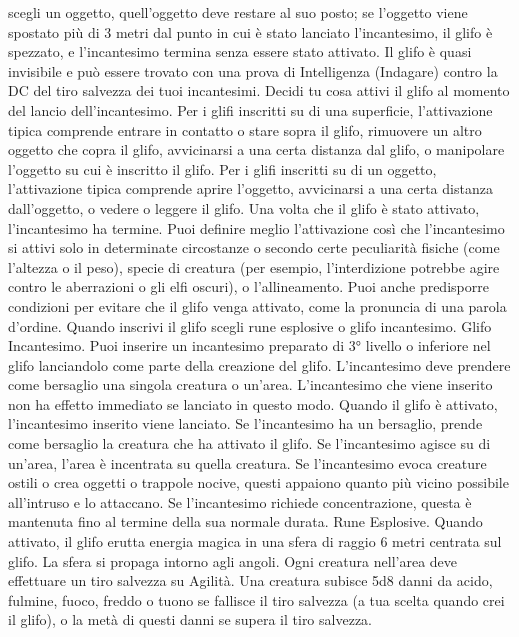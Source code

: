 \begin{multicols}{2}
scegli un oggetto, quell’oggetto deve restare al suo
posto; se l’oggetto viene spostato più di 3 metri dal
punto in cui è stato lanciato l’incantesimo, il glifo è
spezzato, e l’incantesimo termina senza essere stato
attivato.
Il glifo è quasi invisibile e può essere trovato con una
prova di Intelligenza (Indagare) contro la DC del tiro
salvezza dei tuoi incantesimi.
Decidi tu cosa attivi il glifo al momento del lancio
dell’incantesimo.
Per i glifi inscritti su di una superficie, l’attivazione tipica
comprende entrare in contatto o stare sopra il glifo,
rimuovere un altro oggetto che copra il glifo, avvicinarsi
a una certa distanza dal glifo, o manipolare l’oggetto su
cui è inscritto il glifo.
Per i glifi inscritti su di un oggetto, l’attivazione tipica
comprende aprire l’oggetto, avvicinarsi a una certa
distanza dall’oggetto, o vedere o leggere il glifo. Una
volta che il glifo è stato attivato, l’incantesimo ha
termine.
Puoi definire meglio l’attivazione così che l’incantesimo
si attivi solo in determinate circostanze o secondo certe
peculiarità fisiche (come l’altezza o il peso), specie di
creatura (per esempio, l’interdizione potrebbe agire
contro le aberrazioni o gli elfi oscuri), o l’allineamento.
Puoi anche predisporre condizioni per evitare che il glifo
venga attivato, come la pronuncia di una parola
d’ordine.
Quando inscrivi il glifo scegli rune esplosive o glifo
incantesimo.
Glifo Incantesimo. Puoi inserire un incantesimo
preparato di 3° livello o inferiore nel glifo lanciandolo
come parte della creazione del glifo. L’incantesimo
deve prendere come bersaglio una singola creatura o
un’area. L’incantesimo che viene inserito non ha effetto
immediato se lanciato in questo modo. Quando il glifo è
attivato, l’incantesimo inserito viene lanciato. Se
l’incantesimo ha un bersaglio, prende come bersaglio la
creatura che ha attivato il glifo. Se l’incantesimo agisce
su di un’area, l’area è incentrata su quella creatura. Se
l’incantesimo evoca creature ostili o crea oggetti o
trappole nocive, questi appaiono quanto più vicino
possibile all’intruso e lo attaccano. Se l’incantesimo
richiede concentrazione, questa è mantenuta fino al
termine della sua normale durata.
Rune Esplosive. Quando attivato, il glifo erutta energia
magica in una sfera di raggio 6 metri centrata sul glifo.
La sfera si propaga intorno agli angoli. Ogni creatura
nell’area deve effettuare un tiro salvezza su Agilità.
Una creatura subisce 5d8 danni da acido, fulmine,
fuoco, freddo o tuono se fallisce il tiro salvezza (a tua
scelta quando crei il glifo), o la metà di questi danni se
supera il tiro salvezza.

\end{multicols}
